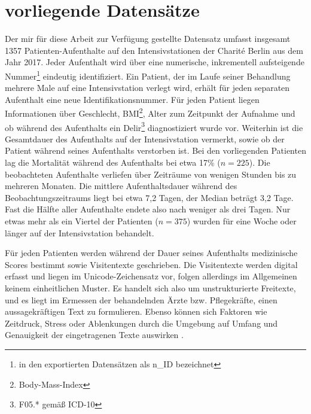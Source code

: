 \section{vorliegende Datensätze} \label{section:vorliegende_daten}
Der mir für diese Arbeit zur Verfügung gestellte Datensatz umfasst insgesamt 1357 Patienten-Aufenthalte auf den Intensivstationen der Charité Berlin aus dem Jahr 2017. Jeder Aufenthalt wird über eine numerische, inkrementell aufsteigende Nummer\footnote{in den exportierten Datensätzen als n\_ID bezeichnet} eindeutig identifiziert. Ein Patient, der im Laufe seiner Behandlung mehrere Male auf eine Intensivstation verlegt wird, erhält für jeden separaten Aufenthalt eine neue Identifikationsnummer. Für jeden Patient liegen Informationen über Geschlecht, BMI\footnote{Body-Mass-Index}, Alter zum Zeitpunkt der Aufnahme und ob während des Aufenthalts ein Delir\footnote{F05.* gemäß ICD-10} diagnostiziert wurde vor. Weiterhin ist die Gesamtdauer des Aufenthalts auf der Intensivstation vermerkt, sowie ob der Patient während seines Aufenthalts verstorben ist. Bei den vorliegenden Patienten lag die Mortalität während des Aufenthalts bei etwa 17\% ($n=225$). Die beobachteten Aufenthalte verliefen über Zeiträume von wenigen Stunden bis zu mehreren Monaten. Die mittlere Aufenthaltsdauer während des Beobachtungszeitraums liegt bei etwa 7,2 Tagen, der Median beträgt 3,2 Tage. Fast die Hälfte aller Aufenthalte endete also nach weniger als drei Tagen. Nur etwas mehr als ein Viertel der Patienten ($n=375$) wurden für eine Woche oder länger auf der Intensivstation behandelt.

Für jeden Patienten werden während der Dauer seines Aufenthalts medizinische Scores  bestimmt sowie Visitentexte geschrieben. Die Visitentexte werden digital erfasst und liegen im Unicode-Zeichensatz vor, folgen allerdings im Allgemeinen keinem einheitlichen Muster. Es handelt sich also um unstrukturierte Freitexte, und es liegt im Ermessen der behandelnden Ärzte bzw. Pflegekräfte, einen aussagekräftigen Text zu formulieren. Ebenso können sich Faktoren wie Zeitdruck, Stress oder Ablenkungen durch die Umgebung auf Umfang und Genauigkeit der eingetragenen Texte auswirken \citep{marxIntensivmedizin2015c}.

